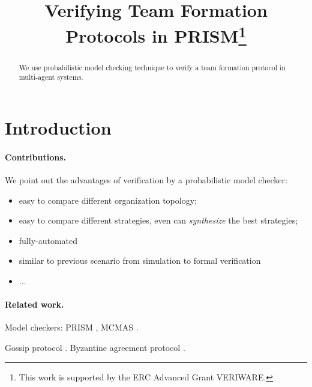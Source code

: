 \documentclass{llncs}
\begin{document}
\title{Verifying Team Formation Protocols in PRISM\thanks{This work is supported by
the ERC Advanced Grant VERIWARE.}}
\author{}
\email{}

\maketitle

\begin{abstract}
We use probabilistic model checking technique to verify a team formation protocol in multi-agent systems.

\end{abstract}

\section{Introduction}

\paragraph{Contributions.}

We point out the advantages of verification by a probabilistic model checker:

\begin{itemize}
  \item easy to compare different organization topology;
  
  \item easy to compare different strategies, even can \emph{synthesize} the best strategies;
  
  \item fully-automated
  
  \item similar to previous scenario from simulation to formal verification
  
  \item ...
\end{itemize}

\paragraph{Related work.}

Model checkers: PRISM \cite{KNP11}, MCMAS \cite{lomuscio2006mcmas}.

Gossip protocol \cite{KNP08d}. Byzantine agreement protocol \cite{KN02}.
\end{document}
